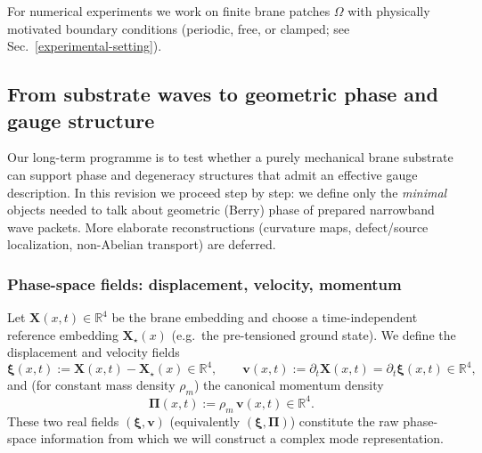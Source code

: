 For numerical experiments we work on finite brane patches
$\Omega$ with physically motivated boundary conditions
(periodic, free, or clamped; see Sec.~\ref{experimental-setting}).

\subsection{From substrate waves to geometric phase and gauge structure}
\label{sec:brane-to-berry-to-em}

Our long-term programme is to test whether a purely mechanical brane substrate can
support phase and degeneracy structures that admit an effective gauge description.
In this revision we proceed step by step: we define only the \emph{minimal} objects
needed to talk about geometric (Berry) phase of prepared narrowband wave packets.
More elaborate reconstructions (curvature maps, defect/source localization, non-Abelian
transport) are deferred.

\subsubsection{Phase-space fields: displacement, velocity, momentum}
Let $\mathbf X(x,t)\in\mathbb R^4$ be the brane embedding and choose a time-independent
reference embedding $\mathbf X_\star(x)$ (e.g.\ the pre-tensioned ground state).
We define the displacement and velocity fields
\begin{equation}
  \boldsymbol\xi(x,t) := \mathbf X(x,t)-\mathbf X_\star(x)\in\mathbb R^4,
  \qquad
  \mathbf v(x,t) := \partial_t\mathbf X(x,t)=\partial_t\boldsymbol\xi(x,t)\in\mathbb R^4,
  \label{eq:xi-and-velocity}
\end{equation}
and (for constant mass density $\rho_m$) the canonical momentum density
\begin{equation}
  \boldsymbol\Pi(x,t) := \rho_m\,\mathbf v(x,t)\in\mathbb R^4.
  \label{eq:pi-from-velocity}
\end{equation}
These two real fields $(\boldsymbol\xi,\mathbf v)$ (equivalently $(\boldsymbol\xi,\boldsymbol\Pi)$)
constitute the raw phase-space information from which we will construct a complex mode
representation.

